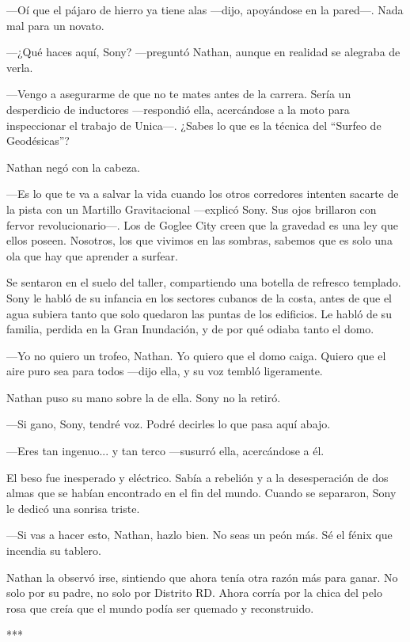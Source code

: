 \documentclass[11pt,twoside]{book}
\begin{document}
---Oí que el pájaro de hierro ya tiene alas ---dijo, apoyándose en la pared---. Nada mal para un novato.

---¿Qué haces aquí, Sony? ---preguntó Nathan, aunque en realidad se alegraba de verla.

---Vengo a asegurarme de que no te mates antes de la carrera. Sería un desperdicio de inductores ---respondió ella, acercándose a la moto para inspeccionar el trabajo de Unica---. ¿Sabes lo que es la técnica del ``Surfeo de Geodésicas''?

Nathan negó con la cabeza.

---Es lo que te va a salvar la vida cuando los otros corredores intenten sacarte de la pista con un Martillo Gravitacional ---explicó Sony. Sus ojos brillaron con fervor revolucionario---. Los de Goglee City creen que la gravedad es una ley que ellos poseen. Nosotros, los que vivimos en las sombras, sabemos que es solo una ola que hay que aprender a surfear.

Se sentaron en el suelo del taller, compartiendo una botella de refresco templado. Sony le habló de su infancia en los sectores cubanos de la costa, antes de que el agua subiera tanto que solo quedaron las puntas de los edificios. Le habló de su familia, perdida en la Gran Inundación, y de por qué odiaba tanto el domo.

---Yo no quiero un trofeo, Nathan. Yo quiero que el domo caiga. Quiero que el aire puro sea para todos ---dijo ella, y su voz tembló ligeramente.

Nathan puso su mano sobre la de ella. Sony no la retiró.

---Si gano, Sony, tendré voz. Podré decirles lo que pasa aquí abajo.

---Eres tan ingenuo... y tan terco ---susurró ella, acercándose a él.

El beso fue inesperado y eléctrico. Sabía a rebelión y a la desesperación de dos almas que se habían encontrado en el fin del mundo. Cuando se separaron, Sony le dedicó una sonrisa triste.

---Si vas a hacer esto, Nathan, hazlo bien. No seas un peón más. Sé el fénix que incendia su tablero.

Nathan la observó irse, sintiendo que ahora tenía otra razón más para ganar. No solo por su padre, no solo por Distrito RD. Ahora corría por la chica del pelo rosa que creía que el mundo podía ser quemado y reconstruido.

\bigskip
\begin{center}***\end{center}
\bigskip
\end{document}

